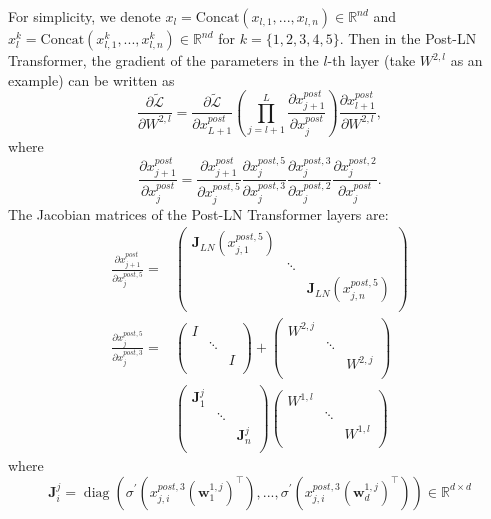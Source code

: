 \documentclass{article}
\begin{document}
For simplicity, we denote $x_l=\text{Concat}(x_{l,1},...,x_{l,n})\in \mathbb{R}^{nd}$ and $x_l^k=\text{Concat}(x_{l,1}^k,...,x_{l,n}^k)\in \mathbb{R}^{nd}$ for $k=\{1,2,3,4,5\}$. Then in the Post-LN Transformer, the gradient of the parameters in the $l$-th layer (take $W^{2,l}$ as an example) can be written as
$$\frac{\partial \tilde{\mathcal{L}}}{\partial W^{2,l}}=\frac{\partial \tilde{\mathcal{L}}}{\partial x^{post}_{L+1}}(\prod_{j=l+1}^{L}\frac{\partial x^{post}_{j+1}}{\partial x^{post}_j})\frac{\partial x^{post}_{l+1}}{\partial W^{2,l}},$$ where $$\frac{\partial x^{post}_{j+1}}{\partial x^{post}_j}=
\frac{\partial x^{post}_{j+1}}{\partial x_j^{post,5}}\frac{\partial x_{j}^{post,5}}{\partial x_j^{post,3}}\frac{\partial x_{j}^{post,3}}{\partial x_j^{post,2}}\frac{\partial x_{j}^{post,2}}{\partial x_j^{post}}.
$$
The Jacobian matrices of the Post-LN Transformer layers are:
\begin{align}
\frac{\partial x_{j+1}^{post}}{\partial x_j^{post,5}}=&\left(
  \begin{array}{ccc}
    \mathbf{J}_{LN}(x_{j,1}^{post,5}) &  &  \\
     & \ddots &  \\
     &  & \mathbf{J}_{LN}(x_{j,n}^{post,5}) \\
  \end{array}
\right)\\
\frac{\partial x_j^{post,5}}{\partial x_j^{post,3}}=&\left(
  \begin{array}{ccc}
    I &  &  \\
     & \ddots &  \\
     &  &  I\\
  \end{array}
\right)+
\left(
  \begin{array}{ccc}
    W^{2,j} &  &  \\
     & \ddots &  \\
     &  & W^{2,j} \\
  \end{array}
\right)\nonumber\\
&
\left(
  \begin{array}{ccc}
    \mathbf{J}^{j}_1 &  &  \\
     & \ddots &  \\
     &  & \mathbf{J}^{j}_n \\
  \end{array}
\right)
\left(
  \begin{array}{ccc}
    W^{1,l} &  &  \\
     & \ddots &  \\
     &  & W^{1,l} \\
  \end{array}
\right)
\end{align}
where 
\begin{dmath*}
\mathbf{J}^{j}_i = \operatorname{diag}\left(\sigma^{\prime}\left( x_{j,i}^{post,3}\left(\mathbf{w}_{1}^{1,j}\right)^{\top}\right), 
...,\sigma^{\prime}\left( x_{j,i}^{post,3}\left(\mathbf{w}_{d}^{1,j}\right)^{\top}\right)\right) \in \mathbb{R}^{d \times d}
\end{dmath*}
\end{document}
